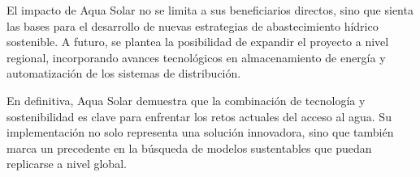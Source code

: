 \documentclass[12pt]{article}
\begin{document}
El impacto de Aqua Solar no se limita a sus beneficiarios directos, sino que sienta las bases para el desarrollo de nuevas estrategias de abastecimiento hídrico sostenible. A futuro, se plantea la posibilidad de expandir el proyecto a nivel regional, incorporando avances tecnológicos en almacenamiento de energía y automatización de los sistemas de distribución.

En definitiva, Aqua Solar demuestra que la combinación de tecnología y sostenibilidad es clave para enfrentar los retos actuales del acceso al agua. Su implementación no solo representa una solución innovadora, sino que también marca un precedente en la búsqueda de modelos sustentables que puedan replicarse a nivel global.
\end{document}
